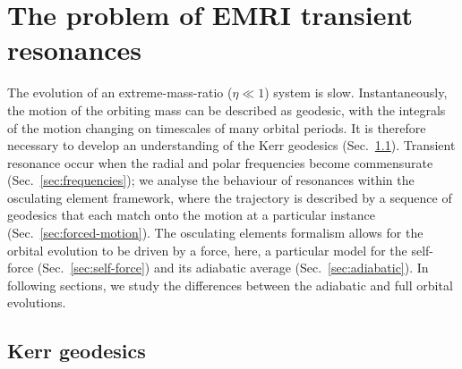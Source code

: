 \documentclass[aps,prd,amsfonts,amssymb,amsmath,nofootinbib,showpacs,superscriptaddress,twocolumn]{revtex4}
\newcommand{\secref}[1]{Sec.~\ref{sec:#1}}
\begin{document}
\section{The problem of EMRI transient resonances}
\label{sec:problem}

The evolution of an extreme-mass-ratio ($\eta \ll 1$) system is slow. Instantaneously, the motion of the orbiting mass can be described as geodesic, with the integrals of the motion changing on timescales of many orbital periods. It is therefore necessary to develop an understanding of the Kerr geodesics (\secref{geodesic}). Transient resonance occur when the radial and polar frequencies become commensurate (\secref{frequencies}); we analyse the behaviour of resonances within the osculating element framework, where the trajectory is described by a sequence of geodesics that each match onto the motion at a particular instance (\secref{forced-motion}). The osculating elements formalism allows for the orbital evolution to be driven by a force, here, a particular model for the self-force (\secref{self-force}) and its adiabatic average (\secref{adiabatic}). In following sections, we study the differences between the adiabatic and full orbital evolutions.

\subsection{Kerr geodesics}
\label{sec:geodesic}
\end{document}
